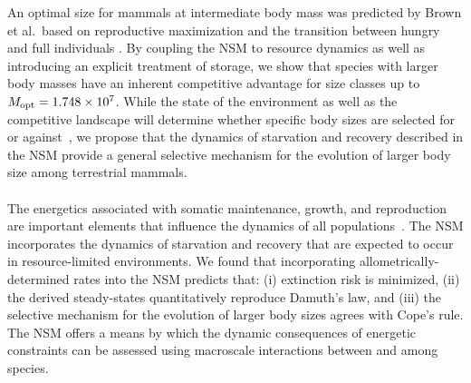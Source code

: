 \documentclass[twocolumn,preprintnumbers,amsmath,amssymb,superscriptaddress]{revtex4}
\begin{document}
An optimal size for mammals at intermediate body mass was predicted by Brown et al.\ based on reproductive maximization and the transition between hungry and full individuals \cite{Brown:1993p708}. 
By coupling the NSM to resource dynamics as well as introducing an explicit treatment of storage, we show that species with larger body masses have an inherent competitive advantage for size classes up to $M_{\rm opt}= 1.748\times10^7$.
While the state of the environment as well as the competitive landscape will determine whether specific body sizes are selected for or against~\citep{Saarinen:2014br}, we propose that the dynamics of starvation and recovery described in the NSM provide a general selective mechanism for the evolution of larger body size among terrestrial mammals.\\

 \\




The energetics associated with somatic maintenance, growth, and reproduction
are important elements that influence the dynamics of all
populations~\citep{Stearns:1989ip}.  The NSM incorporates the dynamics of
starvation and recovery that are expected to occur in resource-limited
environments.  We found that incorporating allometrically-determined rates
into the NSM predicts that: (i) extinction risk is minimized, (ii) the
derived steady-states quantitatively reproduce Damuth's law, and (iii) the
selective mechanism for the evolution of larger body sizes agrees with Cope's
rule.  The NSM offers a means by which the dynamic consequences of energetic
constraints can be assessed using macroscale interactions between and among
species.
\end{document}
